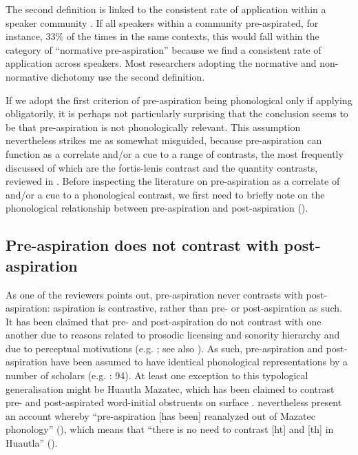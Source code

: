 \documentclass[output=paper]{langscibook}
\begin{document}
The second definition is linked to the consistent rate of application within a speaker community \citep[21]{Helgason2002}. If all speakers within a community pre-aspirated, for instance, 33\% of the times in the same contexts, this would fall within the category of “normative pre-aspiration” because we find a consistent rate of application across speakers. Most researchers adopting the normative and non-normative dichotomy use the second definition.

If we adopt the first criterion of pre\hyp aspiration being phonological only if applying obligatorily, it is perhaps not particularly surprising that the conclusion seems to be that pre\hyp aspiration is not phonologically relevant. This assumption nevertheless strikes me as somewhat misguided, because pre\hyp aspiration can function as a correlate and/or a cue to a range of contrasts, the most frequently discussed of which are the fortis-lenis contrast and the quantity contrasts, reviewed in . Before inspecting the literature on pre\hyp aspiration as a correlate of and/or a cue to a phonological contrast, we first need to briefly note on the phonological relationship between pre\hyp aspiration and post-aspiration ().

\subsection{Pre-aspiration does not contrast with post-aspiration}\label{sec:hejna:3.2}

As one of the reviewers points out, pre\hyp aspiration never contrasts with post-aspiration: aspiration is contrastive, rather than pre- or post-aspiration as such. It has been claimed that pre- and post-aspiration do not contrast with one another due to reasons related to prosodic licensing and sonority hierarchy and due to perceptual motivations (e.g. \cites[90--91, 94, 98, 101--103]{Blevins2004}[327]{GolstonKehrein1998}{GolstonKehrein2013}[Chapter 3]{Kehrein2002}{KehreinGolston2004}; see also ). As such, pre\hyp aspiration and post-aspiration have been assumed to have identical phonological representations by a number of scholars (e.g. \citealt{Blevins2004}: 94). At least one exception to this typological generalisation might be Huautla Mazatec, which has been claimed to contrast pre- and post-aspirated word-initial obstruents on surface \citep{Steriade1994}. \citet{GolstonKehrein1998} nevertheless present an account whereby “pre-aspiration [has been] reanalyzed out of Mazatec phonology” (\citeyear[327]{GolstonKehrein1998}), which means that “there is no need to contrast [ht] and [th] in Huautla” (\citeyear[324]{GolstonKehrein1998}).
\end{document}
